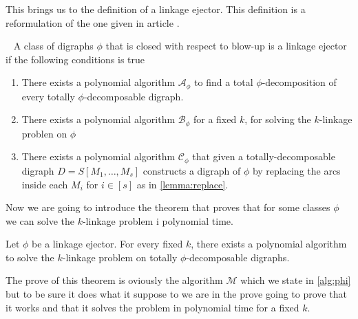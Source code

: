 This brings us to the definition of a linkage ejector. This definition is a reformulation of the one given in article \cite{bangJGT85}.
\begin{definition}~\cite{bangJGT85}
    A class of digraphs $\phi$ that is closed with respect to blow-up is a linkage ejector if the following conditions is true
    \begin{enumerate}
        \item There exists a polynomial algorithm $\mathcal{A}_{\phi}$ to find a total $\phi$-decomposition of every totally $\phi$-decomposable digraph.
        \item There exists a polynomial algorithm $\mathcal{B}_{\phi}$ for a fixed $k$, for solving the $k$-linkage problen on $\phi$
        \item There exists a polynomial algorithm $\mathcal{C}_{\phi}$ that given a totally-decomposable digraph $D=S[M_1,\dots , M_s]$ constructs a digraph of $\phi$ by replacing the arcs inside each $M_i$ for $i\in [s]$ as in \autoref{lemma:replace}. 
    \end{enumerate}
    \label{def:ejector}
\end{definition}
Now we are going to introduce the theorem that proves that for some classes $\phi$ we can solve the $k$-linkage problem i polynomial time.
\begin{thm}
    Let $\phi$ be a linkage ejector. For every fixed $k$, there exists a polynomial algorithm to solve the $k$-linkage problem on totally $\phi$-decomposable digraphs. 
    \label{thm:philinked}
\end{thm}
The prove of this theorem is oviously the algorithm $\mathcal{M}$ which we state in \autoref{alg:phi} but to be sure it does what it suppose to we are in the prove going to prove that it works and that it solves the problem in polynomial time for a fixed $k$. 
